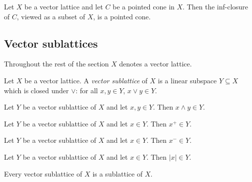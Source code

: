 \begin{lemma}
\label{lem:pointedCone-infClosure}
\leanok
{}
Let $X$ be a vector lattice and let $C$ be a pointed cone in $X$. Then
the inf-closure of $C$, viewed as a subset of $X$, is a pointed cone.
\end{lemma}

\subsection{Vector sublattices}

Throughout the rest of the section $X$ denotes a vector lattice.

\begin{definition}
\label{def:vector-sublattice}
\leanok
{}
Let $X$ be a vector lattice. A \emph{vector sublattice} of $X$ is a
linear subspace $Y \subseteq X$ which is closed under $\vee$: for all
$x, y \in Y$, $x \vee y \in Y$.
\end{definition}

\begin{lemma}
\label{lem:vectorSublattice-inf-mem}
\leanok
{}
Let $Y$ be a vector sublattice of $X$ and let $x, y \in Y$. Then
$x \wedge y \in Y$.
\end{lemma}

\begin{lemma}
\label{lem:vectorSublattice-posPart-mem}
\leanok
{}
Let $Y$ be a vector sublattice of $X$ and let $x \in Y$. Then
$x^+ \in Y$.
\end{lemma}

\begin{lemma}
\label{lem:vectorSublattice-negPart-mem}
\leanok
{}
Let $Y$ be a vector sublattice of $X$ and let $x \in Y$. Then
$x^- \in Y$.
\end{lemma}

\begin{lemma}
\label{lem:vectorSublattice-abs-mem}
\leanok
{}
Let $Y$ be a vector sublattice of $X$ and let $x \in Y$. Then
$\lvert x \rvert \in Y$.
\end{lemma}

\begin{lemma}
\label{lem:vectorSublattice-isSublattice}
\leanok
{}
Every vector sublattice of $X$ is a sublattice of $X$.
\end{lemma}

